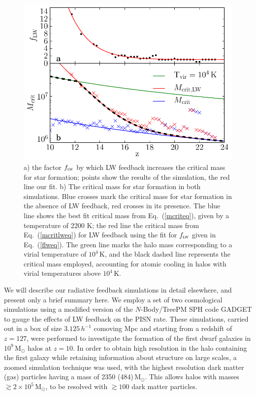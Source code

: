 \documentclass{thesis}
\newcommand{\msun}{\ensuremath{\,\mathrm{M}_{\odot}}\xspace}
\newcommand{\RefEq}[1]{\mbox{Eq.~(\ref{#1})}}
\begin{document}
\begin{figure}
 \begin{center}
   \includegraphics[width=\columnwidth]{lwFeedback}
   \caption{\footnotesize a) the factor $f_{\textsc{lw}}$ by which
     LW feedback increases the critical mass for star formation;
     points show the results of the simulation, the red line our fit.
     b) The critical mass for star formation in both simulations.
     Blue crosses mark the critical mass for star formation in the
     absence of LW feedback, red crosses in its presence.  The blue
     line shows the best fit critical mass from \RefEq{mcriteq}, given
     by a temperature of 2200 K; the red line the critical mass from
     \RefEq{mcritlweq} for LW feedback using the fit for
     $f_{\textsc{lw}}$ given in \RefEq{flweq}.  The green line marks
     the halo mass corresponding to a virial temperature of $10^4\,$K,
     and the black dashed line represents the critical mass employed,
     accounting for atomic cooling in halos with virial temperatures
     above $10^4\,$K.}
   \label{lwFeedback}
 \end{center}
\end{figure}

We will describe our radiative feedback simulations in detail
elsewhere, and present only a brief summary here.  We employ a set of
two cosmological simulations using a modified version of the
$N$-Body/TreePM SPH code GADGET \citep{Springel2005,Springeletal2001}
to gauge the effects of LW feedback on the PISN rate. These
simulations, carried out in a box of size $3.125 \,h^{-1}$ comoving
Mpc and starting from a redshift of $z=127$, were performed to
investigate the formation of the first dwarf galaxies in $10^9$\msun
halos at $z=10$. In order to obtain high resolution in the halo
containing the first galaxy while retaining information about
structure on large scales, a zoomed simulation technique was used,
with the highest resolution dark matter (gas) particles having a mass
of 2350 (484)\msun. This allows halos with masses $\gtrsim 2
\times 10^5$\msun, to be resolved with $\gtrsim 100$ dark
matter particles.
\end{document}
